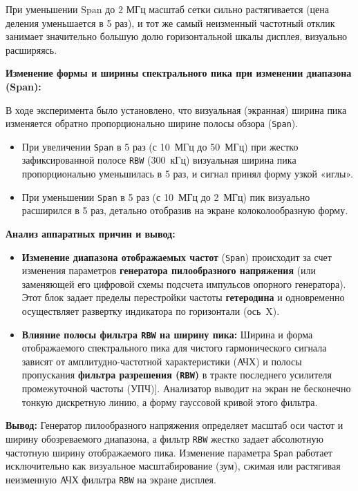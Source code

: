     При уменьшении $\text{Span}$ до $2\text{ МГц}$ масштаб сетки сильно растягивается (цена деления уменьшается в 5 раз), и тот же самый неизменный частотный отклик занимает значительно большую долю горизонтальной шкалы дисплея, визуально расширяясь.

\textbf{Изменение формы и ширины спектрального пика при изменении диапазона (Span):}

В ходе эксперимента было установлено, что визуальная (экранная) ширина пика изменяется обратно пропорционально ширине полосы обзора (\texttt{Span}).
\begin{itemize}
    \item При увеличении \texttt{Span} в 5 раз (с 10~МГц до 50~МГц) при жестко зафиксированной полосе \texttt{RBW} ($300$~кГц) визуальная ширина пика пропорционально уменьшилась в 5 раз, и сигнал принял форму узкой «иглы».
    \item При уменьшении \texttt{Span} в 5 раз (с 10~МГц до 2~МГц) пик визуально расширился в 5 раз, детально отобразив на экране колоколообразную форму.
\end{itemize}

\textbf{Анализ аппаратных причин и вывод:}

\begin{itemize}
    \item \textbf{Изменение диапазона отображаемых частот} (\texttt{Span}) происходит за счет изменения параметров \textbf{генератора пилообразного напряжения} (или заменяющей его цифровой схемы подсчета импульсов опорного генератора). Этот блок задает пределы перестройки частоты \textbf{гетеродина} и одновременно осуществляет развертку индикатора по горизонтали (ось~X).
    \item \textbf{Влияние полосы фильтра \texttt{RBW} на ширину пика:} Ширина и форма отображаемого спектрального пика для чистого гармонического сигнала зависят от амплитудно-частотной характеристики (АЧХ) и полосы пропускания \textbf{фильтра разрешения (\texttt{RBW})} в тракте последнего усилителя промежуточной частоты (УПЧ)]. Анализатор выводит на экран не бесконечно тонкую дискретную линию, а форму гауссовой кривой этого фильтра. 
\end{itemize}

\textbf{Вывод:} 
Генератор пилообразного напряжения определяет масштаб оси частот и ширину обозреваемого диапазона, а фильтр \texttt{RBW} жестко задает абсолютную частотную ширину отображаемого пика. Изменение параметра \texttt{Span} работает исключительно как визуальное масштабирование (зум), сжимая или растягивая неизменную АЧХ фильтра \texttt{RBW} на экране дисплея.